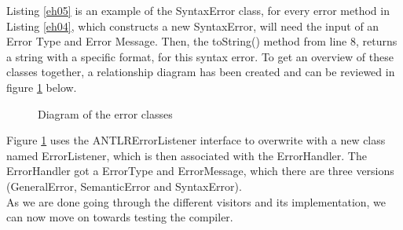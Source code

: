 
\noindent\newline
Listing \ref{eh05} is an example of the SyntaxError class, for every error method in Listing \ref{eh04}, which constructs a new SyntaxError, will need the input of an Error Type and Error Message. Then, the toString() method from line 8, returns a string with a specific format, for this syntax error. 
To get an overview of these classes together, a relationship diagram has been created and can be reviewed in figure \ref{eh06} below.
\begin{figure}[H]
\centering
{}
\caption{Diagram of the error classes}
\label{eh06}
\end{figure}
Figure \ref{eh06} uses the ANTLRErrorListener interface to overwrite with a new class named ErrorListener, which is then associated with the ErrorHandler. The ErrorHandler got a ErrorType and ErrorMessage, which there are three versions (GeneralError, SemanticError and SyntaxError).\\
As we are done going through the different visitors and its implementation, we can now move on towards testing the compiler.